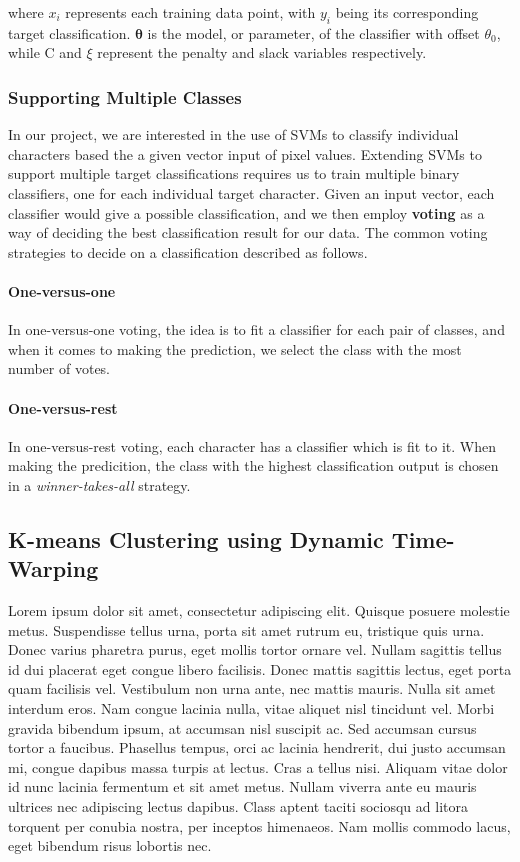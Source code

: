 \documentclass[12pt]{article}
\begin{document}
	where $x_{i}$ represents each training data point, with $y_{i}$ being its corresponding target classification. $\mathbf{\theta}$ is the model, or parameter, of the classifier with offset $\theta_{0}$, while C and $\xi$ represent the penalty and slack variables respectively.
	
	\subsubsection{Supporting Multiple Classes}
	In our project, we are interested in the use of SVMs to classify individual characters based the a given vector input of pixel values. Extending SVMs to support multiple target classifications requires us to train multiple binary classifiers, one for each individual target character. Given an input vector, each classifier would give a possible classification, and we then employ \textbf{voting} as a way of deciding the best classification result for our data. The common voting strategies to decide on a classification described as follows.

	\paragraph{One-versus-one}
	In one-versus-one voting, the idea is to fit a classifier for each pair of classes, and when it comes to making the prediction, we select the class with the most number of votes. 
		
	\paragraph{One-versus-rest}
	In one-versus-rest voting, each character has a classifier which is fit to it. When making the predicition, the class with the highest classification output is chosen in a \textit{winner-takes-all} strategy.

	\subsection{K-means Clustering using Dynamic Time-Warping}
	\label{subsection:dtw}
	Lorem ipsum dolor sit amet, consectetur adipiscing elit. Quisque posuere molestie metus. Suspendisse tellus urna, porta sit amet rutrum eu, tristique quis urna. Donec varius pharetra purus, eget mollis tortor ornare vel. Nullam sagittis tellus id dui placerat eget congue libero facilisis. Donec mattis sagittis lectus, eget porta quam facilisis vel. Vestibulum non urna ante, nec mattis mauris. Nulla sit amet interdum eros. Nam congue lacinia nulla, vitae aliquet nisl tincidunt vel. Morbi gravida bibendum ipsum, at accumsan nisl suscipit ac. Sed accumsan cursus tortor a faucibus. Phasellus tempus, orci ac lacinia hendrerit, dui justo accumsan mi, congue dapibus massa turpis at lectus. Cras a tellus nisi. Aliquam vitae dolor id nunc lacinia fermentum et sit amet metus. Nullam viverra ante eu mauris ultrices nec adipiscing lectus dapibus. Class aptent taciti sociosqu ad litora torquent per conubia nostra, per inceptos himenaeos. Nam mollis commodo lacus, eget bibendum risus lobortis nec.
\end{document}
